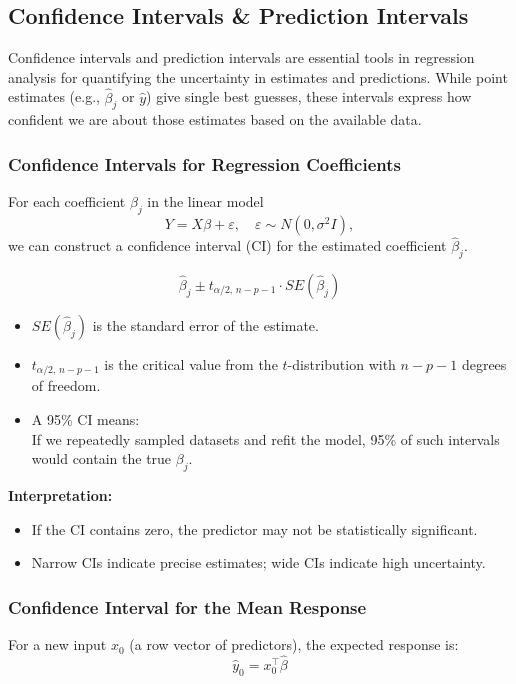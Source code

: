 \documentclass[11pt,a4paper]{article}
\begin{document}
\subsection{Confidence Intervals \& Prediction Intervals}

Confidence intervals and prediction intervals are essential tools in regression analysis for quantifying the uncertainty in estimates and predictions.  
While point estimates (e.g., $\hat{\beta}_j$ or $\hat{y}$) give single best guesses, these intervals express how confident we are about those estimates based on the available data.

\subsubsection{Confidence Intervals for Regression Coefficients}

For each coefficient $\beta_j$ in the linear model
\[
Y = X\beta + \varepsilon, \quad \varepsilon \sim N(0, \sigma^2 I),
\]
we can construct a confidence interval (CI) for the estimated coefficient $\hat{\beta}_j$.

\[
\hat{\beta}_j \pm t_{\alpha/2,\, n-p-1} \cdot SE(\hat{\beta}_j)
\]

\begin{itemize}
    \item $SE(\hat{\beta}_j)$ is the standard error of the estimate.
    \item $t_{\alpha/2,\, n-p-1}$ is the critical value from the $t$-distribution with $n - p - 1$ degrees of freedom.
    \item A 95\% CI means: \\
    If we repeatedly sampled datasets and refit the model, 95\% of such intervals would contain the true $\beta_j$.
\end{itemize}

\textbf{Interpretation:}
\begin{itemize}
    \item If the CI contains zero, the predictor may not be statistically significant.
    \item Narrow CIs indicate precise estimates; wide CIs indicate high uncertainty.
\end{itemize}

\subsubsection{Confidence Interval for the Mean Response}

For a new input $x_0$ (a row vector of predictors), the expected response is:
\[
\hat{y}_0 = x_0^\top \hat{\beta}
\]
\end{document}
